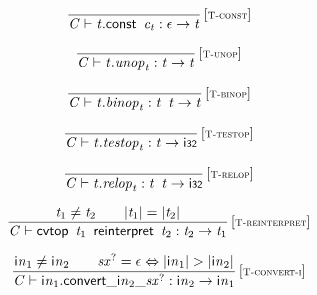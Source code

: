\vspace{1ex}

$$
\begin{array}{@{}c@{}}\displaystyle
\frac{
}{
{\mathit{C}} \vdash {\mathit{t}}.\mathsf{const}~\,{\mathit{c}}_{{\mathit{t}}} : \epsilon \rightarrow {\mathit{t}}
} \, {[\textsc{\scriptsize T{-}const}]}
\qquad
\end{array}
$$

$$
\begin{array}{@{}c@{}}\displaystyle
\frac{
}{
{\mathit{C}} \vdash {\mathit{t}} . {\mathit{unop}}_{{\mathit{t}}} : {\mathit{t}} \rightarrow {\mathit{t}}
} \, {[\textsc{\scriptsize T{-}unop}]}
\qquad
\end{array}
$$

$$
\begin{array}{@{}c@{}}\displaystyle
\frac{
}{
{\mathit{C}} \vdash {\mathit{t}} . {\mathit{binop}}_{{\mathit{t}}} : {\mathit{t}}~\,{\mathit{t}} \rightarrow {\mathit{t}}
} \, {[\textsc{\scriptsize T{-}binop}]}
\qquad
\end{array}
$$

$$
\begin{array}{@{}c@{}}\displaystyle
\frac{
}{
{\mathit{C}} \vdash {\mathit{t}} . {\mathit{testop}}_{{\mathit{t}}} : {\mathit{t}} \rightarrow \mathsf{i{\scriptstyle32}}
} \, {[\textsc{\scriptsize T{-}testop}]}
\qquad
\end{array}
$$

$$
\begin{array}{@{}c@{}}\displaystyle
\frac{
}{
{\mathit{C}} \vdash {\mathit{t}} . {\mathit{relop}}_{{\mathit{t}}} : {\mathit{t}}~\,{\mathit{t}} \rightarrow \mathsf{i{\scriptstyle32}}
} \, {[\textsc{\scriptsize T{-}relop}]}
\qquad
\end{array}
$$

\vspace{1ex}

$$
\begin{array}{@{}c@{}}\displaystyle
\frac{
{\mathit{t}}_{{1}} \neq {\mathit{t}}_{{2}}
 \qquad
{|{\mathit{t}}_{{1}}|} = {|{\mathit{t}}_{{2}}|}
}{
{\mathit{C}} \vdash \mathsf{cvtop}~\,{\mathit{t}}_{{1}}~\,\mathsf{reinterpret}~\,{\mathit{t}}_{{2}} : {\mathit{t}}_{{2}} \rightarrow {\mathit{t}}_{{1}}
} \, {[\textsc{\scriptsize T{-}reinterpret}]}
\qquad
\end{array}
$$

$$
\begin{array}{@{}c@{}}\displaystyle
\frac{
{{\mathsf{i}}{{\mathit{n}}}}_{{1}} \neq {{\mathsf{i}}{{\mathit{n}}}}_{{2}}
 \qquad
{{\mathit{sx}}^?} = \epsilon \Leftrightarrow {|{{\mathsf{i}}{{\mathit{n}}}}_{{1}}|} > {|{{\mathsf{i}}{{\mathit{n}}}}_{{2}}|}
}{
{\mathit{C}} \vdash {{\mathsf{i}}{{\mathit{n}}}}_{{1}} . {{{{\mathsf{convert}}{\mathsf{\_}}}{{{\mathsf{i}}{{\mathit{n}}}}_{{2}}}}{\mathsf{\_}}}{{{\mathit{sx}}^?}} : {{\mathsf{i}}{{\mathit{n}}}}_{{2}} \rightarrow {{\mathsf{i}}{{\mathit{n}}}}_{{1}}
} \, {[\textsc{\scriptsize T{-}convert{-}i}]}
\qquad
\end{array}
$$

